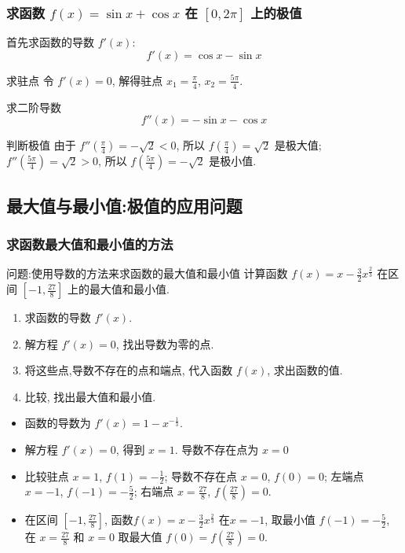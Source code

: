 \documentclass[
10pt,
aspectratio=43,
]{beamer}
\begin{document}
\begin{frame}
	\frametitle{求函数 $f(x)=\sin x+\cos x$ 在 $[0,2 \pi]$ 上的极值}
	\everymath{\displaystyle}
	\begin{block}{}
		首先求函数的导数 $f'(x)$:
		\[ f'(x) = \cos x - \sin x \]
	\end{block}
	\pause
	\begin{block}{求驻点}
		令 $f'(x) = 0$, 解得驻点 $x_1 = \frac{\pi}{4}$, $x_2 = \frac{5\pi}{4}$.
	\end{block}
	\pause
	\begin{block}{求二阶导数}
		\[ f''(x) = -\sin x - \cos x \]
	\end{block}
	\pause
	\begin{block}{判断极值}
		由于 $f''\left(\frac{\pi}{4}\right) = -\sqrt{2} < 0$, 所以 $f\left(\frac{\pi}{4}\right) = \sqrt{2}$ 是极大值;
		$f''\left(\frac{5\pi}{4}\right) = \sqrt{2} > 0$, 所以 $f\left(\frac{5\pi}{4}\right) = -\sqrt{2}$ 是极小值.
	\end{block}
\end{frame}

\subsection{最大值与最小值:极值的应用问题}
\begin{frame}
	\frametitle{求函数最大值和最小值的方法}
	\begin{block}{问题:使用导数的方法来求函数的最大值和最小值}
		计算函数 $f(x)=x-\frac32x^{\frac23}$ 在区间 $[-1,\frac{27}{8}]$ 上的最大值和最小值.
	\end{block}
	\pause
	\begin{block}{}
		\begin{enumerate}
			\item 求函数的导数 $f'(x)$.
			      \pause
			\item 解方程 $f'(x)=0$, 找出导数为零的点.
			      \pause
			\item 将这些点,导数不存在的点和端点, 代入函数 $f(x)$, 求出函数的值.
			      \pause
			\item 比较, 找出最大值和最小值.
		\end{enumerate}
	\end{block}
	\pause
	\begin{block}{}
		\begin{itemize}
			\item 函数的导数为 $f'(x)=1-x^{-\frac13}$.
			      \pause
			\item 解方程 $f'(x)=0$, 得到 $x=1$. 导数不存在点为 $x=0$
			      \pause
			\item 比较驻点 $x=1$, $f(1)=-\frac12$; 导数不存在点 $x=0$, $f(0)=0$; 左端点 $x=-1$, $f(-1)=-\frac{5}{2}$; 右端点 $x=\frac{27}{8}$, $f(\frac{27}{8})=0$.
			      \pause
			\item 在区间 $[-1,\frac{27}{8}]$, 函数$f(x)=x-\frac32x^{\frac23}$ 在$x=-1$, 取最小值 $f(-1)=-\frac{5}{2}$, 在 $x=\frac{27}{8}$ 和 $x=0$ 取最大值 $f(0)=f(\frac{27}{8})=0$.
		\end{itemize}
	\end{block}
\end{frame}
\end{document}
